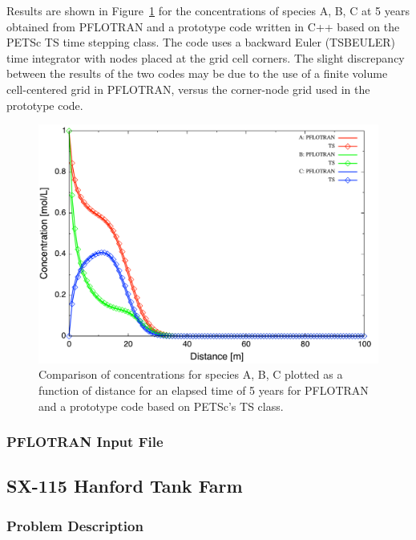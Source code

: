 Results are shown in Figure~\ref{fabc} for the concentrations of species A, B, C at 5 years obtained from PFLOTRAN and a prototype code written in C++ based on the PETSc TS time stepping class. The code uses a backward Euler (TSBEULER) time integrator with nodes placed at the grid cell corners. The slight discrepancy between the results of the two codes may be due to the use of a finite volume cell-centered grid in PFLOTRAN, versus the corner-node grid used in the prototype code.

\begin{figure}[h]\centering
\includegraphics[scale=0.5]{./figs/abc}
\caption{Comparison of concentrations for species A, B, C plotted as a function of distance for an elapsed time of 5 years for PFLOTRAN and a prototype code based on PETSc's TS class.}\label{fabc}
\end{figure}

\subsubsection{PFLOTRAN Input File}

\footnotesize
{}\label{tabc}
\normalsize

\newpage

\subsection{SX-115 Hanford Tank Farm}

\subsubsection{Problem Description}

